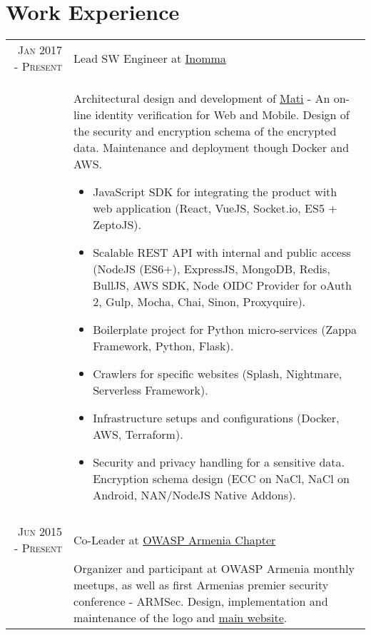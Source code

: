 \documentclass[a4paper,10pt]{article}
\begin{document}
\section{Work Experience}
\begin{tabular}{r|p{11cm}}

\textsc{Jan 2017 - Present}
  & Lead SW Engineer at
    \href{https://www.inomma.com/}{Inomma} \\

& \footnotesize{ Architectural design and development of \href{https://www.getmati.com/}{Mati} - An on-line identity verification
for Web and Mobile. Design of the security and encryption schema of the encrypted data. Maintenance and deployment though Docker and AWS.

  \begin{itemize}
    \item JavaScript SDK for integrating the product with web application
      (React, VueJS, Socket.io, ES5 + ZeptoJS).
    \item Scalable REST API with internal and public access
      (NodeJS (ES6+), ExpressJS, MongoDB, Redis, BullJS, AWS SDK, Node OIDC
      Provider for oAuth 2, Gulp, Mocha, Chai, Sinon, Proxyquire).
    \item Boilerplate project for Python micro-services (Zappa Framework, Python, Flask).
    \item Crawlers for specific websites (Splash, Nightmare, Serverless
    Framework).
    \item Infrastructure setups and configurations (Docker, AWS, Terraform).
    \item Security and privacy handling for a sensitive data. Encryption
    schema design (ECC on NaCl, NaCl on Android, NAN/NodeJS Native Addons).
  \end{itemize}
} \\


\multicolumn{2}{c}{} \\


\textsc{Jun 2015 - Present}
  & Co-Leader at
    \href{https://www.owasp.org/index.php/Armenia}{OWASP Armenia Chapter} \\

  & \footnotesize{
    Organizer and participant at OWASP Armenia monthly meetups, as well as
    first Armenia\textsc{\char13}s premier security conference - ARMSec.
    Design, implementation and maintenance of the logo and
    \href{http://armsec.org/}{main website}.
  } \\



\end{tabular}
\end{document}
